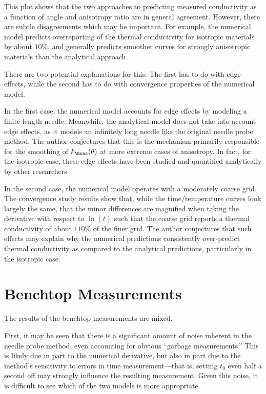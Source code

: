 This plot shows that the two approaches to predicting measured conductivity
as a function of angle and anisotropy ratio are in general agreement. However,
there are subtle disagreements which may be important. For example, the
numerical model predicts overreporting of the thermal conductivity for
isotropic materials by about \(10\%\), and generally predicts smoother
curves for strongly anisotropic materials than the analytical approach.

There are two potential explanations for this: The first has to do with edge
effects, while the second has to do with convergence properties of the numerical
model.

In the first case, the numerical model accounts for edge effects by
modeling a finite length needle. Meanwhile, the analytical model does not take
into account edge effects, as it models an infinitely long needle like the
original needle probe method. The author conjectures that this is the mechanism
primarily responsible for the smoothing of \(k_{\meas}(\theta)\) at more extreme
cases of anisotropy. In fact, for the isotropic case, these edge effects have
been studied and quantified analytically by other researchers.


In the second case, the numerical model operates with a moderately coarse grid.
The convergence study results show that, while the time/temperature curves look
largely the same, that the minor differences are magnified when taking the
derivative with respect to \(\ln(t)\) such that the coarse grid reports a
thermal conductivity of about \(110\%\) of the finer grid. The author
conjectures that such effects may explain why the numerical predictions
consistently over-predict thermal conductivity as compared to the analytical
predictions, particularly in the isotropic case.

\section{Benchtop Measurements}

The results of the benchtop measurements are mixed.

First, it may be seen that there is a significant amount of noise inherent in
the needle probe method, even accounting for obvious ``garbage measurements.''
This is likely due in part to the numerical derivative, but also in part due to
the method's sensitivity to errors in time measurement---that is, setting \(t_0\)
even half a second off may strongly influence the resulting measurement. Given
this noise, it is difficult to see which of the two models is more appropriate.

